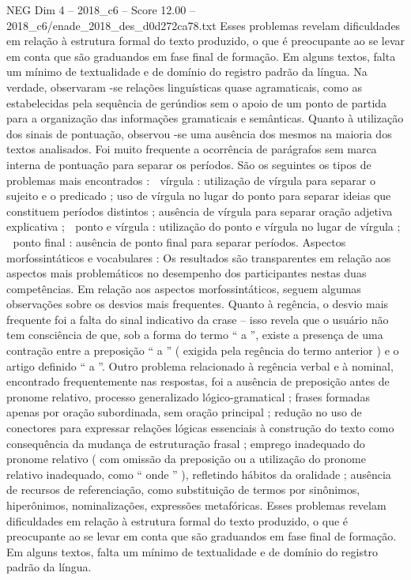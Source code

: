 \begin{textsample}{NEG Dim 4 – 2018\_c6 – Score 12.00 – 2018\_c6/enade\_2018\_des\_d0d272ca78.txt}
Esses problemas revelam dificuldades em relação à estrutura formal do texto produzido, o que é preocupante ao se levar em conta que são graduandos em fase final de formação.
Em alguns textos, falta um mínimo de textualidade e de domínio do registro padrão da língua.
Na verdade, observaram -se relações linguísticas quase agramaticais, como as estabelecidas pela sequência de gerúndios sem o apoio de um ponto de partida para a organização das informações gramaticais e semânticas.
Quanto à utilização dos sinais de pontuação, observou -se uma ausência dos mesmos na maioria dos textos analisados.
Foi muito frequente a ocorrência de parágrafos sem marca interna de pontuação para separar os períodos.
São os seguintes os tipos de problemas mais encontrados :  vírgula : utilização de vírgula para separar o sujeito e o predicado ; uso de vírgula no lugar do ponto para separar ideias que constituem períodos distintos ; ausência de vírgula para separar oração adjetiva explicativa ;  ponto e vírgula : utilização do ponto e vírgula no lugar de vírgula ;  ponto final : ausência de ponto final para separar períodos.
Aspectos morfossintáticos e vocabulares : Os resultados são transparentes em relação aos aspectos mais problemáticos no desempenho dos participantes nestas duas competências.
Em relação aos aspectos morfossintáticos, seguem algumas observações sobre os desvios mais frequentes.
Quanto à regência, o desvio mais frequente foi a falta do sinal indicativo da crase – isso revela que o usuário não tem consciência de que, sob a forma do termo “ a ”, existe a presença de uma contração entre a preposição “ a ” ( exigida pela regência do termo anterior ) e o artigo definido “ a ”.
Outro problema relacionado à regência verbal e à nominal, encontrado frequentemente nas respostas, foi a ausência de preposição antes de pronome relativo, processo generalizado lógico-gramatical ; frases formadas apenas por oração subordinada, sem oração principal ; redução no uso de conectores para expressar relações lógicas essenciais à construção do texto como consequência da mudança de estruturação frasal ; emprego inadequado do pronome relativo ( com omissão da preposição ou a utilização do pronome relativo inadequado, como “ onde ” ), refletindo hábitos da oralidade ; ausência de recursos de referenciação, como substituição de termos por sinônimos, hiperônimos, nominalizações, expressões metafóricas.
Esses problemas revelam dificuldades em relação à estrutura formal do texto produzido, o que é preocupante ao se levar em conta que são graduandos em fase final de formação.
Em alguns textos, falta um mínimo de textualidade e de domínio do registro padrão da língua.

\end{textsample}

